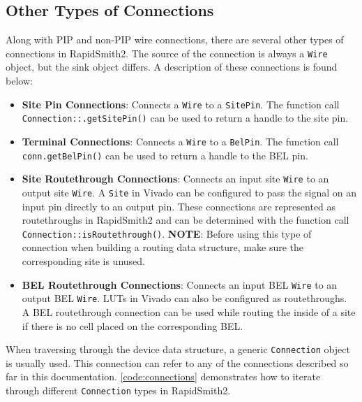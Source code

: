 \subsection{Other Types of Connections} \label{otherConns}
Along with PIP and non-PIP wire connections, there are several other types of
connections in RapidSmith2. The source of the connection is always a
\texttt{Wire} object, but the sink object differs. A description of these
connections is found below:

\begin {itemize}
  
  \item \textbf{Site Pin Connections}: Connects a \texttt{Wire} to a
  \texttt{SitePin}. The function call \texttt{Connection::.get\-SitePin()} can
  be used to return a handle to the site pin.
  
  \item \textbf{Terminal Connections}: Connects a \texttt{Wire} to a \texttt{BelPin}. The
  function call \texttt{conn.get\-BelPin()} can be used to return a handle to
  the BEL pin.
  
  \item \textbf{Site Routethrough Connections}: Connects an input site \texttt{Wire}
  to an output site \texttt{Wire}. A \texttt{Site} in Vivado can be configured to pass
  the signal on an input pin directly to an output pin. These connections are
  represented as routethroughs in RapidSmith2 and can be determined with the
  function call \texttt{Connection::isRoutethrough()}.
  \textbf{NOTE}: Before using this type of connection when building a
  routing data structure, make sure the corresponding site is unused.
  
  \item \textbf{BEL Routethrough Connections}: Connects an input BEL \texttt{Wire} to
  an output BEL \texttt{Wire}. LUTs in Vivado can also be configured as
  routethroughs. A BEL routethrough connection can be used while routing the
  inside of a site if there is no cell placed on the
  corresponding BEL.
\end{itemize}

\noindent
When traversing through the device data structure, a generic \texttt{Connection}
object is usually used. This connection can refer to any of the connections
described so far in this documentation. \autoref{code:connections} demonstrates
how to iterate through different \texttt{Connection} types in RapidSmith2.

